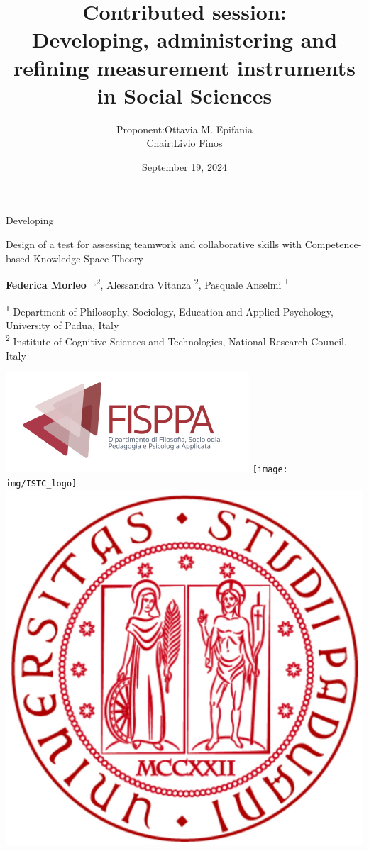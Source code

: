\documentclass{beamer}
\title{Contributed session: \\ Developing, administering and refining measurement instruments in Social Sciences}
\author{\begin{tabular}{rl}
		 Proponent:&  Ottavia M. Epifania \\ 
		 Chair: & Livio Finos \\
	\end{tabular}}
\date{September 19, 2024}
\begin{document}
\begin{frame}[plain]
    \maketitle
\end{frame}
\begin{frame}{Developing}
	\begin{center}
		\begin{Large}
					Design of a test for assessing teamwork and collaborative skills with Competence-based Knowledge Space Theory
		\end{Large}

		
		\vspace{5mm}
		\textbf{Federica Morleo }\textsuperscript{1,2}, Alessandra Vitanza \textsuperscript{2}, Pasquale Anselmi \textsuperscript{1}
		
		\small
		\vspace{3mm}
		\textsuperscript{1}	Department of Philosophy, Sociology, Education and Applied Psychology, University of Padua, Italy \\
		\textsuperscript{2}	Institute of Cognitive Sciences and Technologies, National Research Council, Italy
		
	\end{center}
\centering
\includegraphics[width=.30\linewidth]{img/FISPPA_logo} \hspace{5mm} \texttt{[image: img/ISTC\_logo]} \hspace{8mm} \includegraphics[width=.15\linewidth]{img/logoUnipd}

\end{frame}
\end{document}
